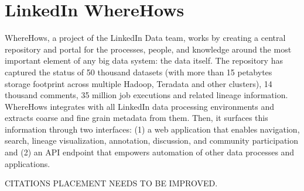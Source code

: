 \section{LinkedIn WhereHows}

WhereHows, a project of the LinkedIn Data team, works by creating a central
repository and portal for the processes, people, and knowledge around the most
important element of any big data system: the data itself. The repository has
captured the status of 50 thousand datasets (with more than 15 petabytes storage
footprint across multiple Hadoop, Teradata and other clusters), 14 thousand
comments, 35 million job executions and related lineage
information.\cite{ wherehows-web} WhereHows integrates with all LinkedIn data
processing environments and extracts coarse and fine grain metadata from them.
Then, it surfaces this information through two interfaces: (1) a web application
that enables navigation, search, lineage visualization, annotation, discussion,
and community participation and (2) an API endpoint that empowers automation of
other data processes and applications.\cite{wherehows-wiki}
 
CITATIONS PLACEMENT NEEDS TO BE IMPROVED.

